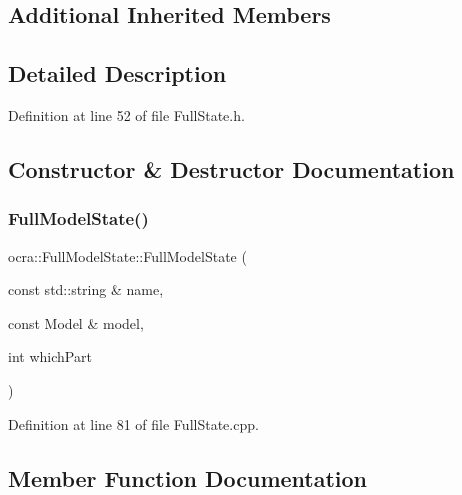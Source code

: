 \subsection*{Additional Inherited Members}


\subsection{Detailed Description}


Definition at line 52 of file Full\+State.\+h.



\subsection{Constructor \& Destructor Documentation}
\hypertarget{classocra_1_1FullModelState_a2fc326508bd940f338c614c18549a7ba}{}\label{classocra_1_1FullModelState_a2fc326508bd940f338c614c18549a7ba} 
\subsubsection{\texorpdfstring{Full\+Model\+State()}{FullModelState()}}
{\footnotesize\ttfamily ocra\+::\+Full\+Model\+State\+::\+Full\+Model\+State (\begin{DoxyParamCaption}\item[{const std\+::string \&}]{name,  }\item[{const Model \&}]{model,  }\item[{int}]{which\+Part }\end{DoxyParamCaption})}



Definition at line 81 of file Full\+State.\+cpp.



\subsection{Member Function Documentation}
\hypertarget{classocra_1_1FullModelState_a988dec9567fd2b083ecfb6f3348d9a09}{}\label{classocra_1_1FullModelState_a988dec9567fd2b083ecfb6f3348d9a09} 
